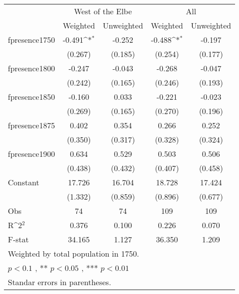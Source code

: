 {
\def\sym#1{\ifmmode^{#1}\else\(^{#1}\)\fi}
\begin{tabular}{@{\extracolsep{2pt}}l*{4}{c}@{}}
\hline\hline
& \multicolumn{2}{c}{West of the Elbe} & \multicolumn{2}{c}{All} \\
\cline{2-3}
\cline{4-5}
 & Weighted & Unweighted & Weighted & Unweighted \\
\hline
fpresence1750 & -0.491\sym{*} & -0.252 & -0.488\sym{*} & -0.197 \\
 & (0.267) & (0.185) & (0.254) & (0.177) \\
fpresence1800 & -0.247 & -0.043 & -0.268 & -0.047 \\
 & (0.242) & (0.165) & (0.246) & (0.193) \\
fpresence1850 & -0.160 & 0.033 & -0.221 & -0.023 \\
 & (0.269) & (0.165) & (0.270) & (0.196) \\
fpresence1875 & 0.402 & 0.354 & 0.266 & 0.252 \\
 & (0.350) & (0.317) & (0.328) & (0.324) \\
fpresence1900 & 0.634 & 0.529 & 0.503 & 0.506 \\
 & (0.438) & (0.432) & (0.407) & (0.458) \\
Constant & 17.726 & 16.704 & 18.728 & 17.424 \\
 & (1.332) & (0.859) & (0.896) & (0.677) \\

\hline
Obs & 74 & 74 & 109 & 109 \\
R\sym{2} & 0.376 & 0.100 & 0.226 & 0.070 \\
F-stat & 34.165 & 1.127 & 36.350 & 1.209 \\
\hline\hline
\multicolumn{5}{l}{\footnotesize Weighted by total population in 1750.} \\
\multicolumn{5}{l}{\footnotesize *$p < 0.1$ , ** $p < 0.05$ , *** $p < 0.01$} \\
\multicolumn{5}{l}{\footnotesize Standar errors in parentheses.} \\
\end{tabular}
}